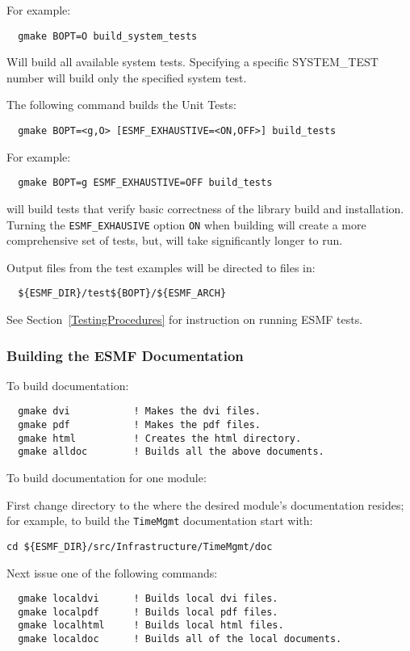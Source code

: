 For example:
\begin{verbatim}
  gmake BOPT=O build_system_tests
\end{verbatim}
Will build all available system tests. Specifying a specific SYSTEM\_TEST number will build only the specified system test.

\noindent The following command builds the Unit Tests:
\begin{verbatim}
  gmake BOPT=<g,O> [ESMF_EXHAUSTIVE=<ON,OFF>] build_tests
\end{verbatim}

For example:
\begin{verbatim}
  gmake BOPT=g ESMF_EXHAUSTIVE=OFF build_tests
\end{verbatim}
will build tests that verify basic correctness of the library build and installation. Turning the {\tt ESMF\_EXHAUSIVE} option {\tt ON} when building will create a more comprehensive set of tests, but, will take significantly longer to run. 

Output files from the test examples will be directed to files in:
\begin{verbatim}
  ${ESMF_DIR}/test${BOPT}/${ESMF_ARCH}
\end{verbatim}

See Section~\ref{TestingProcedures} for instruction on running ESMF tests.

\subsubsection{Building the ESMF Documentation}
\label{BuildDocumentation}

\noindent To build documentation:
\begin{verbatim}
  gmake dvi           ! Makes the dvi files.
  gmake pdf           ! Makes the pdf files.
  gmake html          ! Creates the html directory.
  gmake alldoc        ! Builds all the above documents.
\end{verbatim}

\noindent To build documentation for one module:

\noindent First change directory to the where the desired module's documentation resides;  for
example, to build the {\tt TimeMgmt} documentation start with:

\begin{verbatim}
cd ${ESMF_DIR}/src/Infrastructure/TimeMgmt/doc
\end{verbatim}

\noindent Next issue one of the following commands:
\begin{verbatim}
  gmake localdvi      ! Builds local dvi files.
  gmake localpdf      ! Builds local pdf files.
  gmake localhtml     ! Builds local html files.
  gmake localdoc      ! Builds all of the local documents.
\end{verbatim}

